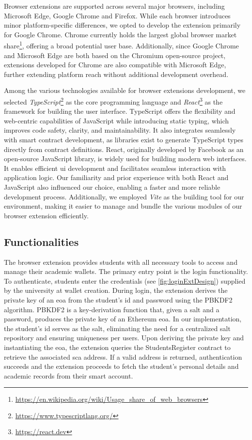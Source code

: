 Browser extensions are supported across several major browsers, including Microsoft Edge, Google Chrome and Firefox. While each browser introduces minor platform-specific differences, we opted to develop the extension primarily for Google Chrome. Chrome currently holds the largest global browser market share\footnote{\url{https://en.wikipedia.org/wiki/Usage_share_of_web_browsers}}, offering a broad potential user base. Additionally, since Google Chrome and Microsoft Edge are both based on the Chromium open-source project, extensions developed for Chrome are also compatible with Microsoft Edge, further extending platform reach without additional development overhead.

Among the various technologies available for browser extensions development, we selected \textit{TypeScript}\footnote{\url{https://www.typescriptlang.org/}} as the core programming language and \textit{React}\footnote{\url{https://react.dev}} as the framework for building the user interface. TypeScript offers the flexibility and web-centric capabilities of JavaScript while introducing static typing, which improves code safety, clarity, and maintainability. It also integrates seamlessly with smart contract development, as libraries exist to generate TypeScript types directly from contract definitions.
React, originally developed by Facebook as an open-source JavaScript library, is widely used for building modern web interfaces. It enables efficient \gls{ui} development and facilitates seamless interaction with application logic.
Our familiarity and prior experience with both React and JavaScript also influenced our choice, enabling a faster and more reliable development process. Additionally, we employed \textit{Vite} as the building tool for our environment, making it easier to manage and bundle the various modules of our browser extension efficiently.

\subsection{Functionalities}
\label{ssec:extFunctionalities}
The browser extension provides students with all necessary tools to access and manage their academic wallets. The primary entry point is the login functionality. To authenticate, students enter the credentials (see \cref{fig:loginExtDesign}) supplied by the university at wallet creation. During login, the extension derives the private key of an \gls{eoa} from the student's \gls{id} and password using the PBKDF2 algorithm. PBKDF2 is a key-derivation function that, given a \gls{salt} and a password, produces the private key of an Ethereum \gls{eoa}. In our implementation, the student's \gls{id} serves as the \gls{salt}, eliminating the need for a centralized \gls{salt} repository and ensuring uniqueness per users. Upon deriving the private key and instantiating the \gls{eoa}, the extension queries the StudentsRegister contract to retrieve the associated \gls{sca} address. If a valid address is returned, authentication succeeds and the extension proceeds to fetch the student's personal details and academic records from their smart account.

